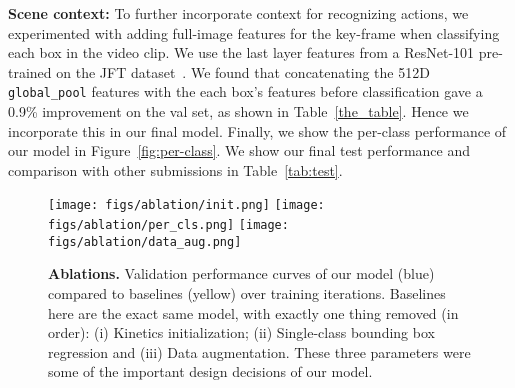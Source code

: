 \documentclass{article}
\begin{document}
\vspace{2mm}
{\noindent \bf Scene context:} To further incorporate context for recognizing actions, we experimented with adding full-image features for the key-frame when classifying each box in the video clip. We use the last layer features from a ResNet-101 pre-trained on the JFT dataset~\cite{sun2017revisiting}. We found that concatenating the 512D \texttt{global\_pool} features with the each box's features before classification gave a 0.9\% improvement on the val set, as shown in Table~\ref{the_table}. Hence we incorporate this in our final model.
Finally, we show the per-class performance of our model in Figure~\ref{fig:per-class}. We show our final test performance and comparison with other submissions in Table~\ref{tab:test}.

\begin{figure}[t]
    \centering
    \texttt{[image: figs/ablation/init.png]}\hfill
    \texttt{[image: figs/ablation/per\_cls.png]}
    \texttt{[image: figs/ablation/data\_aug.png]}\hfill
    \caption{{\bf Ablations.} Validation performance curves of our model (blue) compared to baselines (yellow) over training iterations. Baselines here are the exact same model, with exactly one thing removed (in order): (i) Kinetics initialization; (ii) Single-class bounding box regression and (iii) Data augmentation. These three parameters were some of the important design decisions of our model.}
    \label{fig:ablations}
\end{figure}
\end{document}
